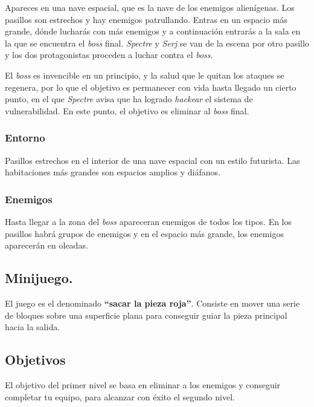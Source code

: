 \documentclass[11pt, twoside]{article}
\begin{document}
Apareces en una nave espacial, que es la nave de los enemigos alienígenas. Los pasillos son estrechos y hay enemigos patrullando. Entras en un espacio más grande, dónde lucharás con más enemigos y a continuación entrarás a la sala en la que se encuentra el \textit{boss} final. \textit{Spectre} y \textit{Serj} se van de la escena por otro pasillo y los dos protagonistas proceden a luchar contra el \textit{boss}. 

El \textit{boss} es invencible en un principio, y la salud que le quitan los ataques se regenera, por lo que el objetivo es permanecer con vida hasta llegado un cierto punto, en el que \textit{Spectre} avisa que ha logrado \textit{hackear} el sistema de vulnerabilidad. En este punto, el objetivo es eliminar al \textit{boss} final. 

\subsubsection{Entorno}

Pasillos estrechos en el interior de una nave espacial con un estilo futurista. Las habitaciones más grandes son espacios amplios y diáfanos. 

\subsubsection{Enemigos}

Hasta llegar a la zona del \textit{boss} apareceran enemigos de todos los tipos. En los pasillos habrá grupos de enemigos y en el espacio más grande, los enemigos aparecerán en oleadas.

\subsection{Minijuego.}

El juego es el denominado \textbf{``sacar la pieza roja''}. Consiste en mover una serie de bloques sobre una superficie plana para conseguir guiar la pieza principal hacia la salida.


\pagestyle{notsection}

\newpage

\pagestyle{insection}
\subsection{Objetivos}

El objetivo del primer nivel se basa en eliminar a los enemigos y conseguir completar tu equipo, para alcanzar con éxito el segundo nivel.
\end{document}
